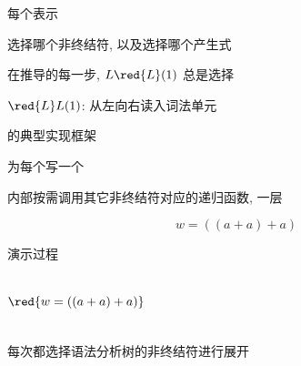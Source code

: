 \begin{frame}{}
  \begin{center}
    每个表示

    \vspace{0.50cm}
     选择哪个非终结符, 以及选择哪个产生式

    \pause
    \vspace{1.50cm}
    在推导的每一步, $L\red{L}(1)$ 总是选择

    \pause
    \vspace{1.60cm}
    $\red{L}L(1)$: 从左向右读入词法单元
  \end{center}
\end{frame}

\begin{frame}{}
  \begin{center}
    {\large {}的典型实现框架}


    为每个写一个

    \vspace{0.20cm}
    内部按需调用其它非终结符对应的递归函数, 一层
  \end{center}
\end{frame}

\begin{frame}{}
  \begin{center}
    
    \[
      w = ((a + a) + a)
    \]
  \end{center}
\end{frame}

\begin{frame}{}
  \begin{center}
    演示过程

    \begin{columns}
        

        \vspace{-0.80cm}
        \[
          \red{w = ((a + a) + a)}
        \]
    \end{columns}

    \pause
    \vspace{0.30cm}
    每次都选择语法分析树的非终结符进行展开
  \end{center}
\end{frame}

